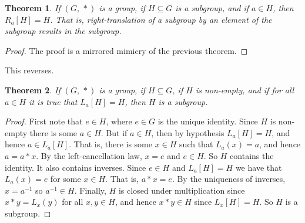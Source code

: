 \documentclass{article}
\theoremstyle{plain}
\newtheorem{theorem}{Theorem}[section]
\theoremstyle{normal}
\begin{document}
        \begin{theorem}
            If $(G,\,*)$ is a group, if $H\subseteq{G}$ is a subgroup, and if
            $a\in{H}$, then $R_{a}[H]=H$. That is, right-translation of a
            subgroup by an element of the subgroup results in the subgroup.
        \end{theorem}
        \begin{proof}
            The proof is a mirrored mimicry of the previous theorem.
        \end{proof}
        This reverses.
        \begin{theorem}
            If $(G,\,*)$ is a group, if $H\subseteq{G}$, if $H$ is non-empty,
            and if for all $a\in{H}$ it is true that
            $L_{a}[H]=H$, then $H$ is a subgroup.
        \end{theorem}
        \begin{proof}
            First note that $e\in{H}$, where $e\in{G}$ is the unique identity.
            Since $H$ is non-empty there is some $a\in{H}$. But if $a\in{H}$,
            then by hypothesis $L_{a}[H]=H$, and hence $a\in{L}_{a}[H]$.
            That is, there is some $x\in{H}$ such that $L_{a}(x)=a$, and hence
            $a=a*x$. By the left-cancellation law, $x=e$ and $e\in{H}$. So $H$
            contains the identity. It also contains inverses. Since $e\in{H}$
            and $L_{a}[H]=H$ we have that $L_{a}(x)=e$ for some $x\in{H}$.
            That is, $a*x=e$. By the uniqueness of inverses, $x=a^{-1}$ so
            $a^{-1}\in{H}$. Finally, $H$ is
            closed under multiplication since $x*y=L_{x}(y)$ for all
            $x,y\in{H}$, and hence $x*y\in{H}$ since
            $L_{x}[H]=H$. So $H$ is a subgroup.
        \end{proof}
\end{document}
